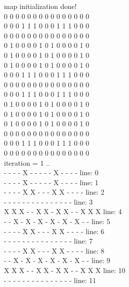 \documentclass[a4paper, 14pt]{article}
\begin{document}
\begin{enumerate}
{map initialization done!\\
 0  0  0  0  0  0  0  0  0  0  0  0  0  0  0 \\
 0  0  0  1  1  1  0  0  0  1  1  1  0  0  0 \\
 0  0  0  0  0  0  0  0  0  0  0  0  0  0  0 \\
 0  1  0  0  0  0  1  0  1  0  0  0  0  1  0 \\
 0  1  0  0  0  0  1  0  1  0  0  0  0  1  0 \\
 0  1  0  0  0  0  1  0  1  0  0  0  0  1  0 \\
 0  0  0  1  1  1  0  0  0  1  1  1  0  0  0 \\
 0  0  0  0  0  0  0  0  0  0  0  0  0  0  0 \\
 0  0  0  1  1  1  0  0  0  1  1  1  0  0  0 \\
 0  1  0  0  0  0  1  0  1  0  0  0  0  1  0 \\
 0  1  0  0  0  0  1  0  1  0  0  0  0  1  0 \\
 0  1  0  0  0  0  1  0  1  0  0  0  0  1  0 \\
 0  0  0  0  0  0  0  0  0  0  0  0  0  0  0 \\
 0  0  0  1  1  1  0  0  0  1  1  1  0  0  0 \\
 0  0  0  0  0  0  0  0  0  0  0  0  0  0  0 \\
iteration = 1 ..\\
 -  -  -  -  X  -  -  -  -  -  X  -  -  -  - 	line: 0\\
 -  -  -  -  X  -  -  -  -  -  X  -  -  -  - 	line: 1\\
 -  -  -  -  X  X  -  -  -  X  X  -  -  -  - 	line: 2\\
 -  -  -  -  -  -  -  -  -  -  -  -  -  -  - 	line: 3\\
 X  X  X  -  -  X  X  -  X  X  -  -  X  X  X 	line: 4\\
 -  -  X  -  X  -  X  -  X  -  X  -  X  -  - 	line: 5\\
 -  -  -  -  X  X  -  -  -  X  X  -  -  -  - 	line: 6\\
 -  -  -  -  -  -  -  -  -  -  -  -  -  -  - 	line: 7\\
 -  -  -  -  X  X  -  -  -  X  X  -  -  -  - 	line: 8\\
 -  -  X  -  X  -  X  -  X  -  X  -  X  -  - 	line: 9\\
 X  X  X  -  -  X  X  -  X  X  -  -  X  X  X 	line: 10\\
 -  -  -  -  -  -  -  -  -  -  -  -  -  -  - 	line: 11\\
}
\end{enumerate}
\end{document}

